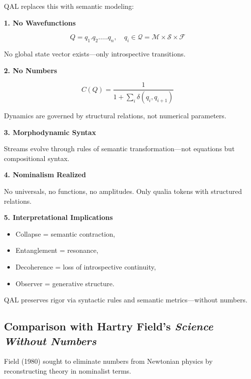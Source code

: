 \documentclass[11pt]{article}
\numberwithin{equation}{section} %
\begin{document}
QAL replaces this with semantic modeling:

\bigskip

\textbf{1. No Wavefunctions}

\begin{equation}
Q = q_1 . q_2 . \dots . q_n, \quad q_i \in \mathcal{Q} = \mathcal{M} \times \mathcal{S} \times \mathcal{F}
\end{equation}

No global state vector exists---only introspective transitions.

\bigskip

\textbf{2. No Numbers}

\begin{equation}
C(Q) = \frac{1}{1 + \sum_i \delta(q_i, q_{i+1})}
\end{equation}

Dynamics are governed by structural relations, not numerical parameters.

\bigskip

\textbf{3. Morphodynamic Syntax}

Streams evolve through rules of semantic transformation---not equations but compositional syntax.

\bigskip

\textbf{4. Nominalism Realized}

No universals, no functions, no amplitudes. Only qualia tokens with structured relations.

\bigskip

\textbf{5. Interpretational Implications}

\begin{itemize}
  \item Collapse = semantic contraction,
  \item Entanglement = resonance,
  \item Decoherence = loss of introspective continuity,
  \item Observer = generative structure.
\end{itemize}

QAL preserves rigor via syntactic rules and semantic metrics---without numbers.

\subsection{Comparison with Hartry Field's \textit{Science Without Numbers}}

Field (1980) sought to eliminate numbers from Newtonian physics by reconstructing theory in nominalist terms.
\end{document}
